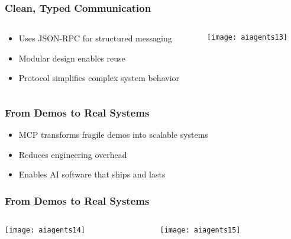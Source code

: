 \begin{frame}[fragile]\frametitle{Clean, Typed Communication}
\begin{columns}
    \begin{column}[T]{0.5\linewidth}
      \begin{itemize}
        \item Uses JSON-RPC for structured messaging
        \item Modular design enables reuse
        \item Protocol simplifies complex system behavior
      \end{itemize}

    \end{column}
    \begin{column}[T]{0.5\linewidth}
		\begin{center}
		\texttt{[image: aiagents13]}
		\end{center}
    \end{column}
  \end{columns}
\end{frame}

\begin{frame}[fragile]\frametitle{From Demos to Real Systems}


      \begin{itemize}
        \item MCP transforms fragile demos into scalable systems
        \item Reduces engineering overhead
        \item Enables AI software that ships and lasts
      \end{itemize}

	
\end{frame}

\begin{frame}[fragile]\frametitle{From Demos to Real Systems}

\begin{columns}
    \begin{column}[T]{0.5\linewidth}
		\begin{center}
		\texttt{[image: aiagents14]}
		\end{center}

    \end{column}
    \begin{column}[T]{0.5\linewidth}
		\begin{center}
		\texttt{[image: aiagents15]}
		\end{center}
    \end{column}
  \end{columns}
  


\end{frame}

